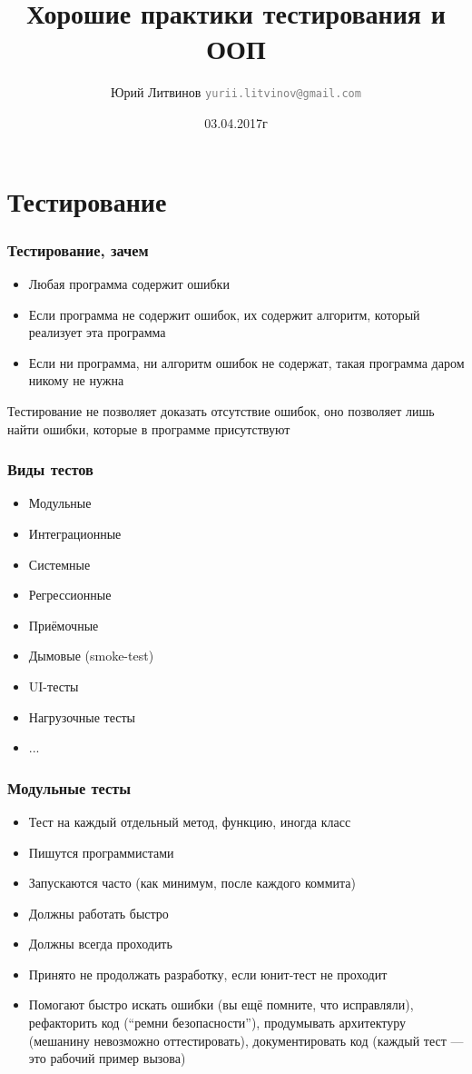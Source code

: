 \documentclass[xetex,mathserif,serif]{beamer}
\title{Хорошие практики тестирования и ООП}
\author[Юрий Литвинов]{Юрий Литвинов \newline \textcolor{gray}{\small\texttt{yurii.litvinov@gmail.com}}}
\date{03.04.2017г}
\begin{document}
	
	\frame{\titlepage}

	\section{Тестирование}

	\begin{frame}
		\frametitle{Тестирование, зачем}
		\begin{itemize}
			\item Любая программа содержит ошибки
			\item Если программа не содержит ошибок, их содержит алгоритм, который реализует эта программа
			\item Если ни программа, ни алгоритм ошибок не содержат, такая программа даром никому не нужна
		\end{itemize}
		Тестирование не позволяет доказать отсутствие ошибок, оно позволяет лишь найти ошибки, которые в программе присутствуют
	\end{frame}

	\begin{frame}
		\frametitle{Виды тестов}
		\begin{itemize}
			\item Модульные
			\item Интеграционные
			\item Системные
		\end{itemize}
		\begin{itemize}
			\item Регрессионные
			\item Приёмочные
			\item Дымовые (smoke-test)
		\end{itemize}
		\begin{itemize}
			\item UI-тесты
			\item Нагрузочные тесты
			\item ...
		\end{itemize}
	\end{frame}

	\begin{frame}
		\frametitle{Модульные тесты}
		\begin{itemize}
			\item Тест на каждый отдельный метод, функцию, иногда класс
			\item Пишутся программистами
			\item Запускаются часто (как минимум, после каждого коммита)
			\item Должны работать быстро
			\item Должны всегда проходить 
			\item Принято не продолжать разработку, если юнит-тест не проходит
			\item Помогают быстро искать ошибки (вы ещё помните, что исправляли), рефакторить код (``ремни безопасности''), продумывать архитектуру (мешанину невозможно оттестировать), документировать код (каждый тест --- это рабочий пример вызова)
		\end{itemize}
	\end{frame}
\end{document}

